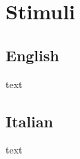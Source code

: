 \setchapterpreamble[u]{\margintoc}
\chapter{Stimuli}

\section{English}

text 

\section{Italian}

text 
